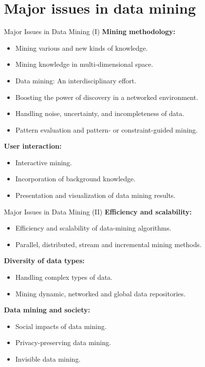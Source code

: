 \section{Major issues in data mining}

\begin{frame}{Major Issues in Data Mining (I)}
	\textbf{Mining methodology:}\\
	\begin{itemize}
		\item Mining various and new kinds of knowledge.
		\item Mining knowledge in multi-dimensional space.
		\item Data mining: An interdisciplinary effort.
		\item Boosting the power of discovery in a networked environment.
		\item Handling noise, uncertainty, and incompleteness of data.
		\item Pattern evaluation and pattern- or constraint-guided mining.
	\end{itemize}
	\textbf{User interaction:}\\
	\begin{itemize}
		\item Interactive mining.
		\item Incorporation of background knowledge.
		\item Presentation and visualization of data mining results.
	\end{itemize}
\end{frame}

\begin{frame}{Major Issues in Data Mining (II)}
	\textbf{Efficiency and scalability:}\\
	\begin{itemize}
		\item Efficiency and scalability of data-mining algorithms.
		\item Parallel, distributed, stream and incremental mining methods.
	\end{itemize}
	\textbf{Diversity of data types:}\\
	\begin{itemize}
		\item Handling complex types of data.
		\item Mining dynamic, networked and global data repositories.
	\end{itemize}
	\textbf{Data mining and society:}\\
	\begin{itemize}
		\item Social impacts of data mining.
		\item Privacy-preserving data mining.
		\item Invisible data mining.
	\end{itemize}
\end{frame}
